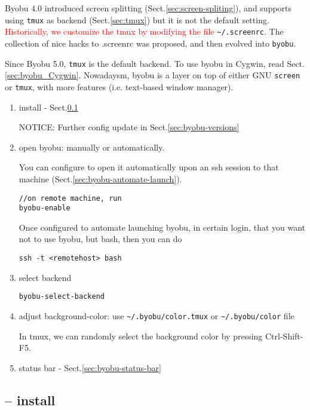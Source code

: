 Byobu 4.0 introduced screen splitting (Sect.\ref{sec:screen-spliting}), and
supports using \verb!tmux! as backend (Sect.\ref{sec:tmux}) but it is not the
default setting.
\textcolor{red}{Historically, we customize the tmux by modifying the file}
\verb!~/.screenrc!. The collection of nice hacks to .screenrc was proposed, and
then evolved into \verb!byobu!.


Since Byobu 5.0, \verb!tmux! is the default backend. To use byobu in Cygwin,
read Sect.\ref{sec:byobu_Cygwin}. Nowadaysm, byobu is a layer on top of either
GNU \verb!screen! or \verb!tmux!, with more features (i.e. text-based window
manager).

\begin{enumerate}
  \item install - Sect.\ref{sec:byobu-install}

NOTICE: Further config update in Sect.\ref{sec:byobu-versions}

  \item open byobu: manually or automatically. 
  
  
 You can configure to open it automatically upon an ssh session to that machine
 (Sect.\ref{sec:byobu-automate-launch}). 
\begin{verbatim}
//on remote machine, run
byobu-enable
\end{verbatim} 
 Once configured to automate launching
 byobu, in certain login, that you want not to use byobu, but bash, then you can do
\begin{verbatim}
ssh -t <remotehost> bash
\end{verbatim}

  \item select backend
\begin{verbatim}
byobu-select-backend
\end{verbatim}


  \item adjust background-color:
  use \verb!~/.byobu/color.tmux! or \verb!~/.byobu/color! file
  
  In tmux, we can randomly select the background color by pressing
  Ctrl-Shift-F5.
  
  \item status bar - Sect.\ref{sec:byobu-status-bar}
   
\end{enumerate}

\subsection{-- install}
\label{sec:byobu-install}

